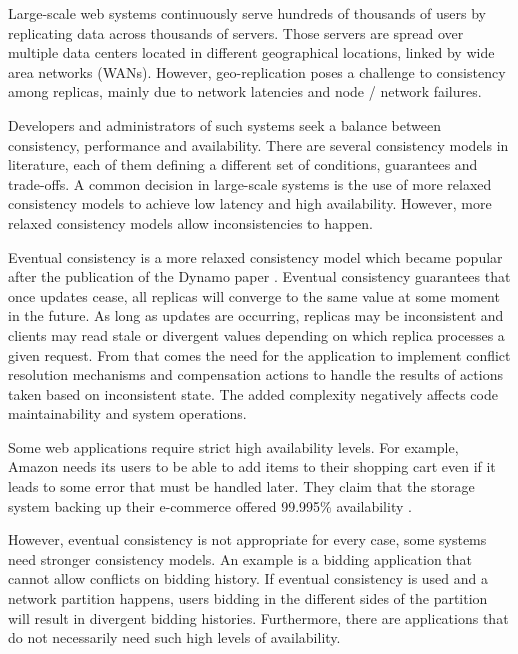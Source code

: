 \documentclass[doublespacing]{bmcart}
\begin{document}
Large-scale web systems continuously serve hundreds of thousands of users by
replicating data across thousands of servers. Those servers are spread over
multiple data centers located in different geographical locations, linked by
wide area networks (WANs). However, geo-replication poses a challenge to
consistency among replicas, mainly due to network latencies and
node / network failures.

Developers and administrators of such systems seek a balance between
consistency, performance and availability. There are several consistency models
in literature, each of them defining a different set of conditions, guarantees
and trade-offs. A common decision in large-scale systems is the use of more
relaxed consistency models to achieve low latency and high availability.
However, more relaxed consistency models allow inconsistencies to
happen.

Eventual consistency is a more relaxed consistency model which became popular
after the publication of the Dynamo paper \cite{DeCandia2007}. Eventual
consistency guarantees that once updates cease, all replicas will converge to the same value at
some moment in the future. As long as updates are occurring, replicas may be
inconsistent and clients may read stale or divergent values depending on which
replica processes a given request. From that comes the need for the application to implement conflict resolution
mechanisms and compensation actions to handle the results of actions taken based
on inconsistent state. The added complexity negatively affects code
maintainability and system operations.

Some web applications require strict high availability levels. For example,
Amazon needs its users to be able to add items to their shopping cart even if it
leads to some error that must be handled later. They claim that the storage
system backing up their e-commerce offered 99.995\% availability
\cite{DeCandia2007}.

However, eventual consistency is not appropriate for every case, some
systems need stronger consistency models. An example is a bidding application that cannot allow conflicts on
bidding history. If eventual consistency is used and a network partition happens, users bidding in the different sides of the partition will result in divergent bidding histories. Furthermore, there are
applications that do not necessarily need such high levels of availability.
\end{document}
